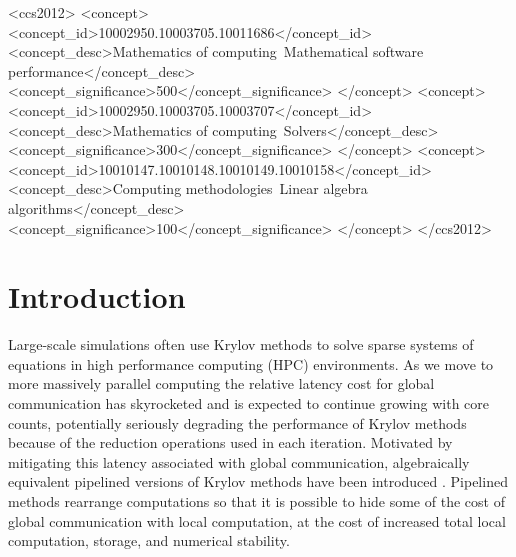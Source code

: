 \documentclass[sigconf]{acmart}
\begin{document}
%
%
\begin{CCSXML}
<ccs2012>
<concept>
<concept_id>10002950.10003705.10011686</concept_id>
<concept_desc>Mathematics of computing~Mathematical software performance</concept_desc>
<concept_significance>500</concept_significance>
</concept>
<concept>
<concept_id>10002950.10003705.10003707</concept_id>
<concept_desc>Mathematics of computing~Solvers</concept_desc>
<concept_significance>300</concept_significance>
</concept>
<concept>
<concept_id>10010147.10010148.10010149.10010158</concept_id>
<concept_desc>Computing methodologies~Linear algebra algorithms</concept_desc>
<concept_significance>100</concept_significance>
</concept>
</ccs2012>
\end{CCSXML}


%

\maketitle

\section{Introduction}


Large-scale simulations often use Krylov methods \cite{saad96iterative,VanDerVorst2003} to solve sparse systems of equations in high performance computing (HPC) environments. 
As we move to more massively parallel computing the relative latency cost for global communication has skyrocketed \cite{HPCChallenge} and is expected to continue growing with core counts, potentially seriously degrading the performance of Krylov methods because of the reduction operations used in each iteration.
Motivated by mitigating this latency associated with global communication, algebraically equivalent pipelined versions of Krylov methods have been introduced 
\cite{Chronopoulos_Gear_1989, GhyselsAshbyMeerbergenVanroose2013, GhyselsVanroose2014, StrzodkaGoddeke06, Sturler_Vorst_1995, JacquesNicolasVollaire12}. 
Pipelined methods rearrange computations so that it is possible to hide some of the cost of global communication with local computation, at the cost of increased total local computation, storage, and numerical stability.
\end{document}
